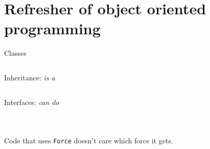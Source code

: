 \section[Refresher]{Refresher of object oriented programming}

\begin{frame}[fragile]{Classes}

    \inputminted{python}{code/refresher/small_refresher_of_classes_and_objects.py}

\end{frame}




\begin{frame}[fragile]{Inheritance: \textit{is a}}

    \inputminted{python}{code/refresher/inheritance_is_a.py}

\end{frame}




\begin{frame}[fragile]{Interfaces: \textit{can do}}

    \begin{columns}[T]
        \inputminted{python}{code/refresher/interface_contract.py}

        \inputminted{python}{code/refresher/interface_usage.py}
        \pause
        \inputminted{python}{code/refresher/interface_broken.py}
    \end{columns}

    \vfill

    \begin{center}
    Code that uses \texttt{Force} doesn't care which force it gets.
    \end{center}

    \vfill
\end{frame}




